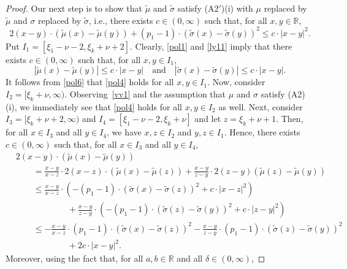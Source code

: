 \documentclass[11pt]{amsart}
\newcommand{\R}{{\mathbb R}}
\theoremstyle{plain}
\theoremstyle{definition}
\begin{document}
\begin{proof}
Our next step is to  show that  $\widetilde \mu$ and $\widetilde \sigma$ satisfy (A2$'$)(i) with $\mu$ replaced by $\widetilde \mu$ and $\sigma$ replaced by $\widetilde \sigma$, i.e.,  there exists $c\in (0, \infty)$ such that,
 for all $x,y\in \R$,
\begin{equation}\label{pol4}
2(x-y)\cdot (\widetilde\mu(x)-\widetilde\mu(y))+(p_1-1)\cdot (\widetilde\sigma(x)-\widetilde\sigma(y))^2\leq c\cdot |x-y|^2.
\end{equation}
Put $I_1=[\xi_1-\nu-2, \xi_k+\nu+2]$.  Clearly, \eqref{pol1} and \eqref{ly11} imply that  there exists $c\in (0, \infty)$ such that, for all $x,y\in I_1$,
\begin{equation}\label{pol6}
|\widetilde\mu(x)-\widetilde\mu(y)|\leq c\cdot |x-y|\quad\text{and}\quad |\widetilde\sigma(x)-\widetilde\sigma(y)|\leq c\cdot |x-y|.
\end{equation}
It follows from \eqref{pol6}  that
\eqref{pol4} holds for all $x,y\in I_1$.
 Now, consider $I_2=[\xi_k+\nu, \infty)$. Observing~\eqref{vv1} and the assumption that  $\mu$ and $\sigma$ satisfy (A2)(i), we immediately see that
\eqref{pol4} holds for all $x,y\in I_2$ as well. Next, consider $I_3=[\xi_k+\nu+2, \infty)$ and $I_4=[\xi_1-\nu-2, \xi_k+\nu]$ and let $z=\xi_k+\nu+1$. Then, for all $x\in I_3$ and all $y\in I_4$, we have $x,z\in I_2$ and $y,z\in I_1$. Hence, there exists $c\in(0, \infty)$ such that, for all $x\in I_3$ and all $y\in I_4$,
\begin{equation}\label{g1}
\begin{aligned}
&2(x-y)\cdot(\widetilde\mu(x)-\widetilde\mu(y))\\
&\qquad=\frac{x-y}{x-z}\cdot 2(x-z)\cdot(\widetilde\mu(x)-\widetilde\mu(z))+\frac{x-y}{z-y}\cdot 2(z-y)(\widetilde\mu(z)-\widetilde\mu(y))\\
&\qquad\leq \frac{x-y}{x-z}\cdot(-(p_1-1)\cdot (\widetilde\sigma(x)-\widetilde\sigma(z))^2+c\cdot |x-z|^2)\\
&\qquad\qquad\qquad+\frac{x-y}{z-y}\cdot
(-(p_1-1)\cdot (\widetilde\sigma(z)-\widetilde\sigma(y))^2+c\cdot |z-y|^2)\\
&\qquad\leq -\frac{x-y}{x-z}\cdot(p_1-1)\cdot (\widetilde\sigma(x)-\widetilde\sigma(z))^2-\frac{x-y}{z-y}\cdot(p_1-1)\cdot (\widetilde\sigma(z)-\widetilde\sigma(y))^2\\
&\qquad\qquad\qquad + 2c\cdot |x-y|^2.
\end{aligned}
\end{equation}
Moreover, using the fact that, for all $a,b\in\R$ and all $\delta\in (0,\infty)$,

\end{proof}
\end{document}
